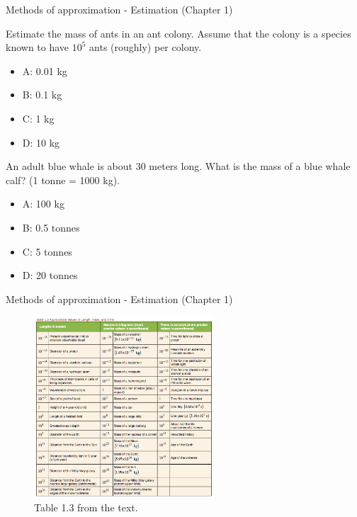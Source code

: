 \documentclass{beamer}
\begin{document}
\begin{frame}{Methods of approximation - Estimation (Chapter 1)}
\small
\begin{minipage}[b]{0.45\linewidth}
Estimate the mass of ants in an ant colony.  Assume that the colony is a species known to have $10^5$ ants (roughly) per colony.
\begin{itemize}
\item A: 0.01 kg
\item B: 0.1 kg
\item C: 1 kg
\item D: 10 kg
\end{itemize}
\end{minipage}
\hspace{0.5cm}
\begin{minipage}[b]{0.45\linewidth}
An adult blue whale is about 30 meters long.  What is the mass of a blue whale calf? (1 tonne = 1000 kg).
\vspace{0.55cm}
\begin{itemize}
\item A: 100 kg
\item B: 0.5 tonnes
\item C: 5 tonnes
\item D: 20 tonnes
\end{itemize}
\end{minipage}
\end{frame}

\begin{frame}{Methods of approximation - Estimation (Chapter 1)}
\begin{figure}
\centering
\includegraphics[width=0.6\textwidth]{figures/tab1.png}
\caption{\label{fig:tab1} Table 1.3 from the text.}
\end{figure}
\end{frame}
\end{document}
